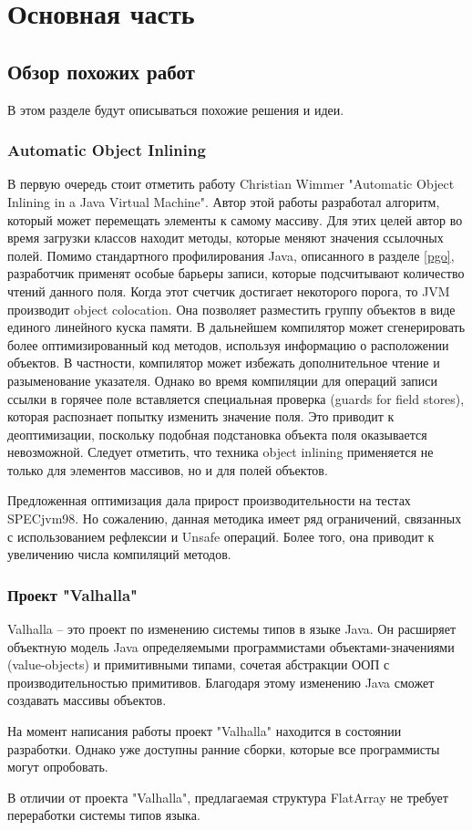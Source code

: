 \section{Основная часть}
\subsection{Обзор похожих работ}
В этом разделе будут описываться похожие решения и идеи.
\subsubsection{Automatic Object Inlining} 
В первую очередь стоит отметить работу Christian Wimmer "Automatic Object Inlining in a Java Virtual Machine"\cite{wimmer-field-inlining}.
Автор этой работы разработал алгоритм, который может перемещать элементы к самому массиву.
Для этих целей автор во время загрузки классов находит методы, которые меняют значения ссылочных полей. 
Помимо стандартного профилирования Java, описанного в разделе \ref{pgo}, разработчик применят особые барьеры записи, которые подсчитывают количество чтений данного поля. Когда этот счетчик достигает некоторого порога, то JVM производит object colocation. 
Она позволяет разместить группу объектов в виде единого линейного куска памяти. 
В дальнейшем компилятор может сгенерировать более оптимизированный код методов, используя информацию о расположении объектов. В частности, компилятор может избежать дополнительное чтение и разыменование указателя. 
Однако во время компиляции для операций записи ссылки в горячее поле вставляется специальная проверка (guards for field stores), которая распознает попытку изменить значение поля. 
Это приводит к деоптимизации, поскольку подобная подстановка объекта поля оказывается невозможной. Следует отметить, что техника object inlining применяется не только для элементов массивов, но и для полей объектов.
\par
Предложенная оптимизация дала прирост производительности на тестах SPECjvm98\cite{spec98}. 
Но сожалению, данная методика имеет ряд ограничений, связанных с использованием рефлексии и Unsafe операций. Более того, она приводит к увеличению числа компиляций методов.
\subsubsection{Проект "Valhalla"}
Valhalla -- это проект по изменению системы типов в языке Java\cite{valhalla}. Он расширяет объектную модель Java определяемыми программистами объектами-значениями (value-objects) и примитивными типами, сочетая абстракции ООП с производительностью примитивов. Благодаря этому изменению Java сможет создавать массивы объектов\cite{valhalla-value-object}.
\par
На момент написания работы проект "Valhalla" находится в состоянии разработки. Однако уже доступны ранние сборки, которые все программисты могут опробовать.
\par
В отличии от проекта "Valhalla", предлагаемая структура FlatArray не требует переработки системы типов языка.

